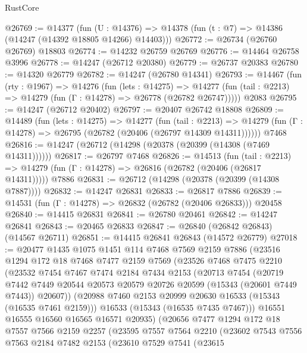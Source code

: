 \begin{lexlean}{RustCore}
\begin{coremodule}
@26769 := @14377
    (fun (U : @14376) => @14378 (fun (t : @7) => @14386 (@14247 (@14392 @18805 @14266) @14403)))
@26772 := @26734 (@26760 @26769) @18803
@26774 := @14232 @26759 @26769
@26776 := @14464 @26758 @3996
@26778 := @14247 (@26712 @20380)
@26779 := @26737 @20383
@26780 := @14320 @26779
@26782 := @14247 (@26780 @14341)
@26793 := @14467
    (fun (rty : @1967) =>
    @14276
      (fun (lets : @14275) =>
      @14277 (fun (tail : @2213) => @14279 (fun (Γ : @14278) => @26778 (@26782 @26747)))))
    @2083
@26795 := @14247 (@26712 @20402)
@26797 := @20407 @26742 @18808
@26809 := @14489
    (fun (lets : @14275) =>
    @14277
      (fun (tail : @2213) =>
      @14279 (fun (Γ : @14278) => @26795 (@26782 (@20406 (@26797 @14309 @14311))))))
    @7468
@26816 := @14247 (@26712 (@14298 (@20378 (@20399 (@14308 (@7469 @14311))))))
@26817 := @26797 @7468
@26826 := @14513
    (fun (tail : @2213) => @14279 (fun (Γ : @14278) => @26816 (@26782 (@20406 (@26817 @14311)))))
    @7886
@26831 := @26712 (@14298 (@20378 (@20399 (@14308 @7887))))
@26832 := @14247 @26831
@26833 := @26817 @7886
@26839 := @14531 (fun (Γ : @14278) => @26832 (@26782 (@20406 @26833))) @20458
@26840 := @14415 @26831
@26841 := @26780 @20461
@26842 := @14247 @26841
@26843 := @20465 @26833
@26847 := @26840 (@26842 @26843) (@14567 @26711)
@26851 := @14415 @26841 @26843 (@14572 @26779)
@27018 := @20477
    @1435
    @1075
    @1451
    @114
    @7468
    @7569
    @2159
    @7886
    (@23516
      @1294
      @172
      @18
      @7468
      @7477
      @2159
      @7569
      (@23526
        @7468
        @7475
        @2210
        (@23532
          @7454
          @7467
          @7474
          @2184
          @7434
          @2153
          (@20713
            @7454
            (@20719
              @7442
              @7449
              @20544
              @20573
              @20579
              @20726
              @20599
              (@15343 (@20601 @7449 @7443))
              @20607))
          (@20988 @7460 @2153 @20999 @20630 @16533 (@15343 (@16535 @7461 @2159)))
          @16533
          (@15343 (@16535 @7435 @7467)))
        @16551
        @16555
        @16560
        @16565
        @16571
        @20935)
      (@20656
        @7477
        @1294
        @172
        @18
        @7557
        @7566
        @2159
        @2257
        (@23595
          @7557
          @7564
          @2210
          (@23602
            @7543
            @7556
            @7563
            @2184
            @7482
            @2153
            (@23610
              @7529
              @7541
              (@23615

\end{coremodule}
\end{lexlean}
